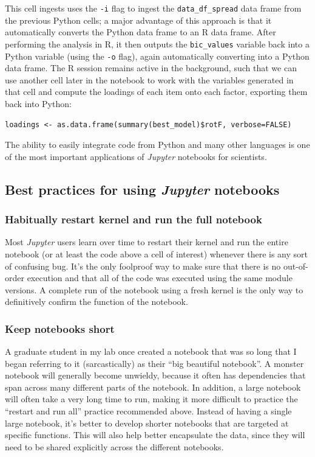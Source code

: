 This cell ingests uses the \texttt{-i} flag to ingest the \texttt{data\_df\_spread} data frame from the previous Python cells; a major advantage of this approach is that it automatically converts the Python data frame to an R data frame. After performing the analysis in R, it then outputs the \texttt{bic\_values} variable back into a Python variable (using the \texttt{-o} flag), again automatically converting into a Python data frame.  The R session remains active in the background, such that we can use another cell later in the notebook to work with the variables generated in that cell and compute the loadings of each item onto each factor, exporting them back into Python:

\begin{lstlisting}[style=R, numbers=none, caption={}]
%%R -o loadings
loadings <- as.data.frame(summary(best_model)$rotF, verbose=FALSE)
\end{lstlisting}

The ability to easily integrate code from Python and many other languages is one of the most important applications of \textit{Jupyter} notebooks for scientists.

\subsection{Best practices for using \textit{Jupyter} notebooks}

\subsubsection{Habitually restart kernel and run the full notebook}

Most \textit{Jupyter} users learn over time to restart their kernel and run the entire notebook (or at least the code above a cell of interest) whenever there is any sort of confusing bug.  It's the only foolproof way to make sure that there is no out-of-order execution and that all of the code was executed using the same module versions.  A complete run of the notebook using a fresh kernel is the only way to definitively confirm the function of the notebook.

\subsubsection{Keep notebooks short}

A graduate student in my lab once created a notebook that was so long that I began referring to it (sarcastically) as their ``big beautiful notebook''.  A monster notebook will generally become unwieldy, because it often has dependencies that span across many different parts of the notebook. In addition, a large notebook will often take a very long time to run, making it more difficult to practice the ``restart and run all'' practice recommended above.  Instead of having a single large notebook, it's better to develop shorter notebooks that are targeted at specific functions.  This will also help better encapsulate the data, since they will need to be shared explicitly across the different notebooks.


